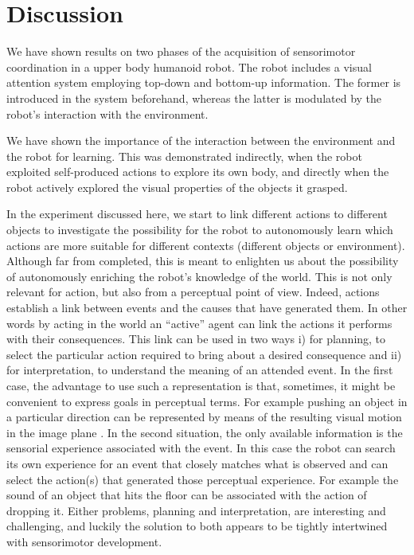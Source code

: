 \section{Discussion}
\label{sect:conclusion}
We have shown results on two phases of the acquisition of sensorimotor coordination in a upper body humanoid robot. The robot includes a visual attention system employing top-down and bottom-up information. The former is introduced in the system beforehand, whereas the latter is modulated by the robot's interaction with the environment. 

We have shown the importance of the interaction between the environment and the robot for learning. This was demonstrated indirectly, when the robot exploited self-produced actions to explore its own body, and directly when the robot actively explored the visual properties of the objects it grasped.

In the experiment discussed here, we start to link different actions to different objects to investigate the possibility for the robot to autonomously learn which actions are more suitable for different contexts (different objects or environment). Although far from completed, this is meant to enlighten us about the possibility of autonomously enriching the robot's knowledge of the world. This is not only relevant for action, but also from a perceptual point of view. Indeed, actions establish a link between events and the causes that have generated them. In other words by acting in the world an ``active'' agent can link the actions it performs with their consequences. This link can be used in two ways i) for planning, to select the particular action required to bring about a desired consequence and ii) for interpretation, to understand the meaning of an attended event. In the first case, the advantage to use such a representation is that, sometimes, it might be convenient to express goals in perceptual terms. For example pushing an object in a particular direction can be represented by means of the resulting visual motion in the image plane \cite{fitzpatrick03learning}.  In the second situation, the only available information is the sensorial experience associated with the event. In this case the robot can search its own experience for an event that closely matches what is observed and can select the action(s) that generated those perceptual experience. For example the sound of an object that hits the floor can be associated with the action of dropping it. Either problems, planning and interpretation, are interesting and challenging, and luckily the solution to both appears to be tightly intertwined with sensorimotor development.

